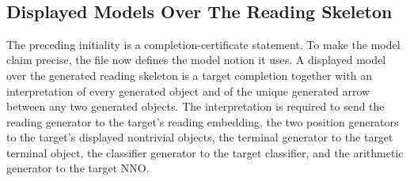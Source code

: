 \documentclass[11pt]{article}
\begin{document}
\begin{code}
\AgdaSpace{}%
\<%
\\
%
\>[2]\AgdaSymbol{;}\AgdaSpace{}%
%
\>[29]\AgdaSymbol{=}\AgdaSpace{}%
\<%
\\
%
\>[2]\AgdaSymbol{;}\AgdaSpace{}%
\AgdaSpace{}%
\AgdaSymbol{=}\AgdaSpace{}%
\<%
\\
%
\>[2]\AgdaSymbol{\}}\<%
\\
%
\\[\AgdaEmptyExtraSkip]%
\>[0]\<%
\\
\>[0]\AgdaSpace{}%
\AgdaSymbol{:}\<%
\\
\>[0][@{}l@{\AgdaIndent{0}}]%
\>[2]\AgdaSymbol{(}\AgdaSpace{}%
\AgdaSymbol{:}\AgdaSpace{}%
\AgdaSymbol{)}\AgdaSpace{}%
\<%
\\
%
\>[2]\AgdaSpace{}%
\AgdaSpace{}%
\<%
\\
%
\>[2]\AgdaSpace{}%
\AgdaSpace{}%
\<%
\\
\>[0]\AgdaSpace{}%
\AgdaSpace{}%
\AgdaSpace{}%
\AgdaSymbol{=}\<%
\\
\>[0][@{}l@{\AgdaIndent{0}}]%
\>[2]\AgdaSpace{}%
\AgdaSpace{}%
\<%
\end{code}

\subsection{Displayed Models Over The Reading Skeleton}

The preceding initiality is a completion-certificate statement.  To make
the model claim precise, the file now defines the model notion it uses.
A displayed model over the generated reading skeleton is a target
completion together with an interpretation of every generated object and
of the unique generated arrow between any two generated objects.  The
interpretation is required to send the reading generator to the target's
reading embedding, the two position generators to the target's displayed
nontrivial objects, the terminal generator to the target terminal object,
the classifier generator to the target classifier, and the arithmetic
generator to the target NNO.
\end{document}
